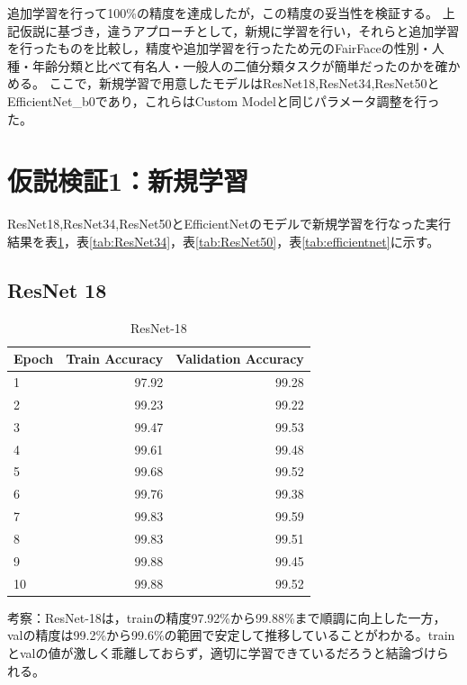\documentclass[a4paper,11pt,titlepage]{jsarticle}
\begin{document}
追加学習を行って100\%の精度を達成したが，この精度の妥当性を検証する。
上記仮説に基づき，違うアプローチとして，新規に学習を行い，それらと追加学習を行ったものを比較し，精度や追加学習を行ったため元のFairFaceの性別・人種・年齢分類と比べて有名人・一般人の二値分類タスクが簡単だったのかを確かめる。
ここで，新規学習で用意したモデルはResNet18,ResNet34,ResNet50とEfficientNet\_b0であり，これらはCustom Modelと同じパラメータ調整を行った。


\section{仮説検証1：新規学習}
ResNet18,ResNet34,ResNet50とEfficientNetのモデルで新規学習を行なった実行結果を表\ref{tab:ResNet18}，表\ref{tab:ResNet34}，表\ref{tab:ResNet50}，表\ref{tab:efficientnet}に示す。

\subsection{ResNet 18}
\begin{table}[H]
\centering
\caption{ResNet-18}
\label{tab:ResNet18}
\begin{tabular}{lrr}
\hline
 Epoch &  Train Accuracy &  Validation Accuracy \\
\hline
     1 &           97.92 &                99.28 \\
     2 &           99.23 &                99.22 \\
     3 &           99.47 &                99.53 \\
     4 &           99.61 &                99.48 \\
     5 &           99.68 &                99.52 \\
     6 &           99.76 &                99.38 \\
     7 &           99.83 &                99.59 \\
     8 &           99.83 &                99.51 \\
     9 &           99.88 &                99.45 \\
    10 &           99.88 &                99.52 \\
\hline
\end{tabular}
\end{table}

考察：ResNet-18は，trainの精度97.92\%から99.88\%まで順調に向上した一方，valの精度は99.2\%から99.6\%の範囲で安定して推移していることがわかる。trainとvalの値が激しく乖離しておらず，適切に学習できているだろうと結論づけられる。
\end{document}
